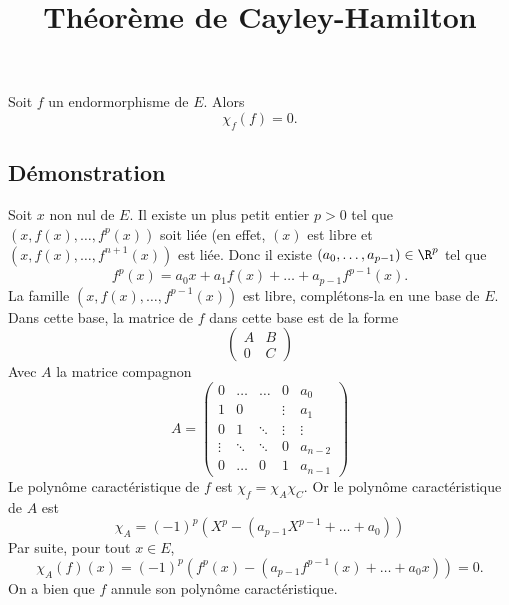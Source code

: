 \documentclass[fontsize=12pt,twoside=false,parskip=half]{scrartcl}
\title{Théorème de Cayley-Hamilton}
\date{}
\author{}
\begin{document}
\maketitle
   \begin{Theoreme}
      Soit $f$ un endormorphisme de $E$. Alors
      \[
         \chi_f(f) = 0.
      \]
   \end{Theoreme}
   \subsection{Démonstration}
      Soit $x$ non nul de $E$. Il existe un plus petit entier $p > 0$ tel que $(x, f(x), \ldots, f^p(x))$ soit liée
      (en effet, $(x)$ est libre et $(x, f(x), \ldots, f^{n + 1}(x))$ est liée. Donc il existe 
      $(a_0, \ldots, a_{p - 1}) \in \R^{p}$ tel que
      \[
         f^p(x) = a_0x + a_1 f(x) + \ldots + a_{p - 1}f^{p - 1}(x).
      \]
      La famille $(x, f(x), \ldots, f^{p - 1}(x))$ est libre, complétons-la en une base de $E$. Dans cette base, 
      la matrice de $f$ dans cette base est de la forme
      \[
         \begin{pmatrix}
            A & B\\
            0 & C
         \end{pmatrix}
      \]
      Avec $A$ la matrice compagnon
      \[
         A = 
         \begin{pmatrix}
            0      & \ldots & \ldots & 0      & a_0\\
            1      & 0      &        & \vdots & a_1\\
            0      & 1      & \ddots & \vdots & \vdots\\
            \vdots & \ddots & \ddots & 0      & a_{n - 2}\\
            0      & \ldots & 0      & 1      & a_{n - 1}
         \end{pmatrix}
      \]
      Le polynôme caractéristique de $f$ est $\chi_f = \chi_A\chi_C$. Or le polynôme caractéristique de $A$ est
      \[
         \chi_A = (-1)^p(X^p - (a_{p - 1}X^{p - 1} + \ldots + a_0))
      \]
      Par suite, pour tout $x \in E$,
      \[
         \chi_A(f)(x) = (-1)^p(f^p(x) - (a_{p - 1}f^{p - 1}(x) + \ldots + a_0x)) = 0.
      \]
      On a bien que $f$ annule son polynôme caractéristique.
\end{document}
